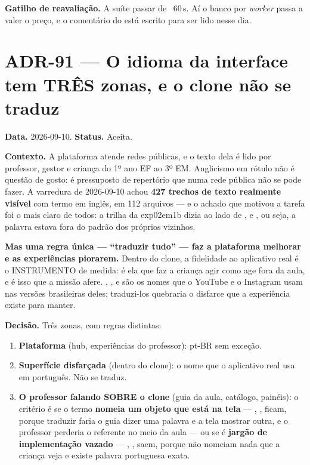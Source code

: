 \textbf{Gatilho de reavaliação.} A suíte passar de ~60\,s. Aí o banco por
\emph{worker} passa a valer o preço, e o comentário do 
está escrito para ser lido nesse dia.

\section{ADR-91 --- O idioma da interface tem TRÊS zonas, e o clone não se traduz}

\textbf{Data.} 2026-09-10. \textbf{Status.} Aceita.

\textbf{Contexto.} A plataforma atende redes públicas, e o texto dela é lido por
professor, gestor e criança do 1º ano EF ao 3º EM. Anglicismo em rótulo não é
questão de gosto: é pressuposto de repertório que numa rede pública não se pode
fazer. A varredura de 2026-09-10 achou \textbf{427 trechos de texto realmente
visível} com termo em inglês, em 112 arquivos --- e o achado que motivou a
tarefa foi o mais claro de todos: a trilha da exp02em1b dizia
 ao lado de ,  e , ou
seja, a palavra estava fora do padrão dos próprios vizinhos.

\textbf{Mas uma regra única --- \enquote{traduzir tudo} --- faz a plataforma
melhorar e as experiências piorarem.} Dentro do clone, a fidelidade ao aplicativo
real é o INSTRUMENTO de medida: é ela que faz a criança agir como age fora da
aula, e é isso que a missão afere. , ,  e
 são os nomes que o YouTube e o Instagram usam nas versões
brasileiras deles; traduzi-los quebraria o disfarce que a experiência existe para
manter.

\textbf{Decisão.} Três zonas, com regras distintas:

\begin{enumerate}
  \item \textbf{Plataforma} (hub, experiências do professor): pt-BR sem exceção.
  \item \textbf{Superfície disfarçada} (dentro do clone): o nome que o aplicativo
    real usa em português. Não se traduz.
  \item \textbf{O professor falando SOBRE o clone} (guia da aula, catálogo,
    painéis): o critério é se o termo \textbf{nomeia um objeto que está na tela}
    --- , ,  ficam, porque traduzir faria o guia
    dizer uma palavra e a tela mostrar outra, e o professor perderia o referente
    no meio da aula --- ou se é \textbf{jargão de implementação vazado} ---
    , ,  saem, porque não nomeiam
    nada que a criança veja e existe palavra portuguesa exata.
\end{enumerate}

